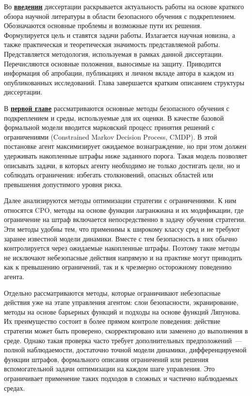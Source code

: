 Во \underline{\textbf{введении}} диссертации раскрывается актуальность работы на основе краткого обзора научной литературы в области безопасного обучения с подкреплением. Обозначаются основные проблемы и возможные пути их решения. Формулируется цель и ставятся задачи работы. Излагается научная новизна, а также практическая и теоретическая значимость представляемой работы. Представляется методология, используемая в рамках данной диссертации. Перечисляются основные положения, выносимые на защиту. Приводится информация об апробации, публикациях и личном вкладе автора в каждом из опубликованных исследований. Глава завершается кратким описанием структуры диссертации.

В \underline{\textbf{первой главе}} рассматриваются основные методы безопасного обучения с подкреплением и среды, используемые для их оценки. В качестве базовой формальной модели вводится марковский процесс принятия решений с ограничениями (Constrained Markov Decision Process, CMDP). В этой постановке агент максимизирует ожидаемое вознаграждение, но при этом должен удерживать накопленные штрафы ниже заданного порога. Такая модель позволяет описывать задачи, в которых агенту необходимо не только достигать цели, но и соблюдать ограничения: избегать столкновений, опасных областей или превышения допустимого уровня риска.

Далее анализируются методы оптимизации стратегии с ограничениями. К ним относятся CPO, методы на основе функции лагранжиана и их модификации, где ограничение на штраф включается непосредственно в задачу обучения стратегии. Эти методы удобны тем, что применимы к широкому классу сред и не требуют заранее известной модели динамики. Вместе с тем безопасность в них обычно контролируется через ожидаемые накопленные штрафы. Поэтому такие методы не исключают небезопасные действия напрямую и на практике могут приводить как к превышению ограничений, так и к чрезмерно осторожному поведению агента.

Отдельно рассматриваются методы, которые ограничивают небезопасные действия уже на этапе управления агентом: слои безопасности, экранирование, методы на основе барьерных функций и подходы на основе функций Ляпунова. Их преимущество состоит в более прямом контроле поведения: действие стратегии может быть проверено, скорректировано или заменено до выполнения в среде. Однако такая проверка часто требует дополнительных предположений~--- полной наблюдаемости, достаточно точной модели динамики, дифференцируемой функции штрафов, формального описания ограничений или решения вспомогательной задачи оптимизации на каждом шаге управления. Это ограничивает применение таких подходов в сложных и частично наблюдаемых средах.

